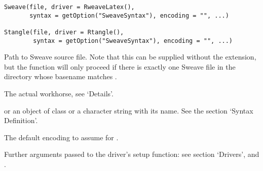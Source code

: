 %
\begin{Usage}
\begin{verbatim}
Sweave(file, driver = RweaveLatex(),
       syntax = getOption("SweaveSyntax"), encoding = "", ...)

Stangle(file, driver = Rtangle(),
        syntax = getOption("SweaveSyntax"), encoding = "", ...)
\end{verbatim}
\end{Usage}
%
\begin{Arguments}
\begin{ldescription}
\item[\code{file}] Path to Sweave source file.  Note that this can be
supplied without the extension, but the function will only proceed
if there is exactly one Sweave file in the directory whose
basename matches .
\item[\code{driver}] The actual workhorse, see `Details'.
\item[\code{syntax}]  or an object of class  or
a character string with its name.
See the section `Syntax Definition'.
\item[\code{encoding}] The default encoding to assume for .
\item[\code{...}] Further arguments passed to the driver's setup function:
see section `Drivers',  and
.
\end{ldescription}
\end{Arguments}
%
